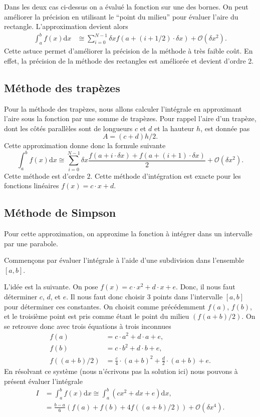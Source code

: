 \documentclass[a4paper,12pt]{book}
\newcommand{\dd}{\mathrm{d}}
\begin{document}
Dans les deux cas ci-dessus on a évalué la fonction sur une des bornes. On peut améliorer la précision
en utilisant le ``point du milieu'' pour évaluer l'aire du rectangle. L'approximation devient alors
\begin{align}
 \int_a^bf(x)\dd x&\cong\sum_{i=0}^{N-1} \delta x f(a+(i+1/2)\cdot\delta x)+\mathcal{O}(\delta x^2).
\end{align}
Cette astuce permet d'améliorer la précision de la méthode à très faible coût.
En effet, la précision de la méthode des rectangles est améliorée et devient d'ordre 2.

\subsection{Méthode des trapèzes}

Pour la méthode des trapèzes, nous allons calculer l'intégrale en approximant l'aire sous la fonction par une somme de trapèzes.
Pour rappel l'aire d'un trapèze, dont les côtés parallèles sont de longueurs $c$ et $d$ et la hauteur $h$, est donnée pas
\begin{equation}
 A=(c+d)h/2. 
\end{equation}
Cette approximation donne donc la formule suivante
\begin{equation}
 \int_a^bf(x)\dd x\cong\sum_{i=0}^{N-1} \delta x \frac{f(a+i\cdot\delta x)+f(a+(i+1)\cdot\delta x)}{2}+\mathcal{O}(\delta x^2).
\end{equation}
Cette méthode est d'ordre $2$. Cette méthode d'intégration est exacte pour les fonctions linéaires $f(x)=c\cdot x + d$.

\subsection{Méthode de Simpson}

Pour cette approximation, on approxime la fonction à intégrer dans un intervalle par une parabole.

Commençons par évaluer l'intégrale à l'aide d'une subdivision dans l'ensemble $[a,b]$.

L'idée est la suivante. On pose $f(x)=c\cdot x^2+d\cdot x+e$. Donc, il nous faut déterminer $c$, $d$, et $e$.
Il nous faut donc choisir 3 points dans l'intervalle $[a,b]$ pour déterminer ces constantes.
On choisit comme précédemment $f(a)$, $f(b)$, et le troisième point est pris comme étant le point du milieu
$(f(a+b)/2)$. On se retrouve donc avec trois équations à trois inconnues
\begin{align}
 f(a)&=c\cdot a^2+d\cdot a+e,\\
 f(b)&=c\cdot b^2+d\cdot b+e,\\
 f((a+b)/2)&=\frac{c}{4}\cdot (a+b)^2+\frac{d}{2}\cdot (a+b)+e.
\end{align}
En résolvant ce système (nous n'écrivons pas la solution ici) nous pouvons à présent évaluer 
l'intégrale 
\begin{align}
 I&=\int_a^b f(x)\dd x\cong\int_a^b (cx^2+dx+e)\dd x,\nonumber\\
 &=\frac{b-a}{6}(f(a)+f(b)+4f((a+b)/2))+\mathcal{O}(\delta x^4).
\end{align}
\end{document}
